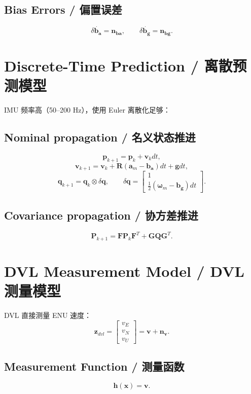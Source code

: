 \documentclass[12pt,a4paper]{ctexart} %
\begin{document}
\subsection{Bias Errors / 偏置误差}
\[
\delta \dot{\mathbf{b_a}} = \mathbf{n_{ba}},
\qquad
\delta \dot{\mathbf{b_g}} = \mathbf{n_{bg}}.
\]

\section{Discrete-Time Prediction / 离散预测模型}

IMU 频率高（50--200 Hz），使用 Euler 离散化足够：

\subsection{Nominal propagation / 名义状态推进}
\[
\mathbf{p}_{k+1} = \mathbf{p}_{k} + \mathbf{v}_{k} dt,
\]
\[
\mathbf{v}_{k+1} = \mathbf{v}_{k}
+ \mathbf{R}(\mathbf{a}_m - \mathbf{b_a}) dt
+ \mathbf{g} dt,
\]
\[
\mathbf{q}_{k+1} = \mathbf{q}_k \otimes \delta\mathbf{q},
\qquad
\delta\mathbf{q} =
\begin{bmatrix}
1 \\ \frac{1}{2}(\boldsymbol{\omega}_m - \mathbf{b_g})dt
\end{bmatrix}.
\]

\subsection{Covariance propagation / 协方差推进}
\[
\mathbf{P}_{k+1} =
\mathbf{F} \mathbf{P}_k \mathbf{F}^T
+ \mathbf{G}\mathbf{Q}\mathbf{G}^T.
\]

\section{DVL Measurement Model / DVL 测量模型}

DVL 直接测量 ENU 速度：
\[
\mathbf{z}_{dvl} =
\begin{bmatrix}
v_E \\ v_N \\ v_U
\end{bmatrix}
= \mathbf{v} + \mathbf{n_v}.
\]

\subsection{Measurement Function / 测量函数}
\[
\mathbf{h}(\mathbf{x}) = \mathbf{v}.
\]
\end{document}
